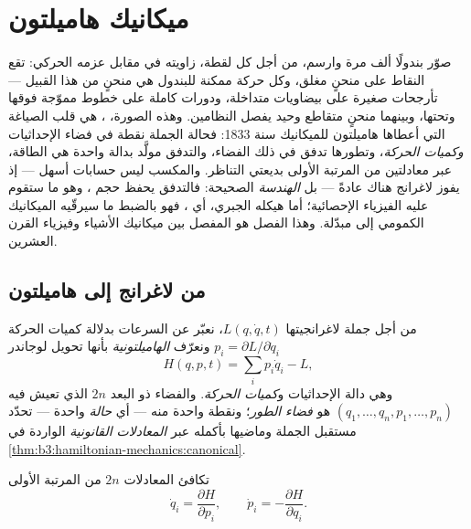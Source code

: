 \chapter{ميكانيك هاميلتون}\label{ch:b3:hamiltonian-mechanics}

صوّر بندولًا ألف مرة وارسم، من أجل كل لقطة، زاويته في مقابل عزمه
الحركي: تقع النقاط على منحنٍ مغلق، وكل حركة ممكنة للبندول هي منحنٍ
من هذا القبيل --- تأرجحات صغيرة على بيضاويات متداخلة، ودورات
كاملة على خطوط مموّجة فوقها وتحتها، وبينهما منحنٍ متقاطع وحيد
يفصل النظامين. وهذه الصورة، \emph{}، هي قلب الصياغة
التي أعطاها هاميلتون للميكانيك سنة 1833: فحالة الجملة نقطة في
فضاء الإحداثيات \emph{وكميات الحركة}، وتطورها تدفق في ذلك
الفضاء، والتدفق مولَّد بدالة واحدة هي الطاقة، عبر معادلتين من
المرتبة الأولى بديعتي التناظر. والمكسب ليس حسابات أسهل --- إذ
يفوز لاغرانج هناك عادةً --- بل \emph{الهندسة} الصحيحة: فالتدفق
يحفظ حجم ، وهو ما ستقوم عليه الفيزياء الإحصائية؛ أما
هيكله الجبري، أي ، فهو بالضبط ما سيرقّيه الميكانيك
الكمومي إلى مبدّلة. وهذا الفصل هو المفصل بين ميكانيك الأشياء
وفيزياء القرن العشرين.

\section{من لاغرانج إلى هاميلتون}

\begin{definition}\label{def:b3:hamiltonian-mechanics:hamiltonian}
من أجل جملة لاغرانجيتها $L(q, \dot q, t)$، نعبّر عن السرعات
بدلالة كميات الحركة $p_i = \partial L/\partial\dot q_i$ ونعرّف
\emph{الهاميلتونية} بأنها تحويل لوجاندر
\[
H(q, p, t) = \sum_i p_i\dot q_i - L ,
\]
وهي دالة الإحداثيات و\emph{كميات الحركة}. والفضاء ذو البعد
$2n$ الذي تعيش فيه $(q_1, \dots, q_n, p_1, \dots, p_n)$ هو
\emph{فضاء الطور}؛ ونقطة واحدة منه --- أي \emph{حالة} واحدة ---
تحدّد مستقبل الجملة وماضيها بأكمله عبر
\emph{المعادلات القانونية} الواردة في
\cref{thm:b3:hamiltonian-mechanics:canonical}.
\end{definition}

\begin{theorem}\label{thm:b3:hamiltonian-mechanics:canonical}
تكافئ  المعادلات $2n$ من المرتبة
الأولى
\[
\dot q_i = \frac{\partial H}{\partial p_i} , \qquad
\dot p_i = -\frac{\partial H}{\partial q_i} .
\]
\end{theorem}

